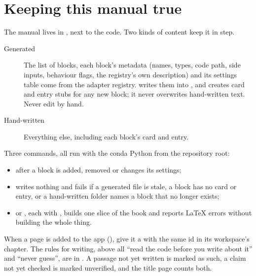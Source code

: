 \section{Keeping this manual true}\label{sec:extending-manual}
The manual lives in , next to the code. Two kinds of content keep it in step.

\begin{description}
\item[Generated] The list of blocks, each block's metadata (names, types, code path, side inputs,
  behaviour flags, the registry's own description) and its settings table come from the adapter
  registry.  writes them into , and
  creates card and entry stubs for any new block; it never overwrites hand-written text. Never edit
   by hand.
\item[Hand-written] Everything else, including each block's card and entry.
\end{description}

Three commands, all run with the conda Python from the repository root:
\begin{itemize}
\item {} after a block is added, removed or changes its
  settings;
\item {} writes nothing and fails if a generated file is
  stale, a block has no card or entry, or a hand-written folder names a block that no longer exists;
\item {} or
  , each with , builds one slice of the book
  and reports LaTeX errors without building the whole thing.
\end{itemize}

When a page is added to the app (), give it a
\code{\pagesection} with the same id in its workspace's chapter. The rules for writing,
above all ``read the code before you write about it'' and ``never guess'', are in
. A passage not yet written is marked as such, a claim not yet checked
is marked unverified, and the title page counts both.
